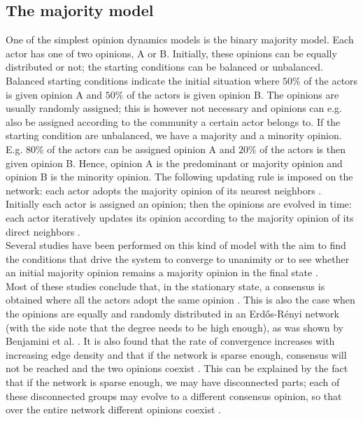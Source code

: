 \documentclass[11 pt , letterpaper , twoside , openright]{book}
\begin{document}
\subsection{The majority model}\label{majModel}

One of the simplest opinion dynamics models is the binary majority model. Each actor has one of two opinions, A or B. Initially, these opinions can be equally distributed or not; the starting conditions can be balanced or unbalanced. Balanced starting conditions indicate the initial situation where $50 \%$ of the actors is given opinion A and $50 \%$ of the actors is given opinion B. The opinions are usually randomly assigned; this is however not necessary and opinions can e.g. also be assigned according to the community a certain actor belongs to. If the starting condition are unbalanced, we have a majority and a minority opinion. E.g. $80 \%$ of the actors can be assigned opinion A and $20 \%$ of the actors is then given opinion B. Hence, opinion A is the predominant or majority opinion and opinion B is the minority opinion. The following updating rule is imposed on the network: each actor adopts the majority opinion of its nearest neighbors \cite{Nguyen2020}. Initially each actor is assigned an opinion; then the opinions are evolved in time: each actor iteratively updates its opinion according to the majority opinion of its direct neighbors \cite{Nguyen2020}.\\
\newline
Several studies have been performed on this kind of model with the aim to find the conditions that drive the system to converge to unanimity or to see whether an initial majority opinion remains a majority opinion in the final state \cite{Nguyen2020}.\\
\newline
Most of these studies conclude that, in the stationary state, a consensus is obtained where all the actors adopt the same opinion \cite{Nguyen2020}. This is also the case when the opinions are equally and randomly distributed in an Erd\H{o}s-R\'{e}nyi network (with the side note that the degree needs to be high enough), as was shown by Benjamini et al. \cite{Benjamini2016}. It is also found that the rate of convergence increases with increasing edge density and that if the network is sparse enough, consensus will not be reached and the two opinions coexist \cite{Nguyen2020}. This can be explained by the fact that if the network is sparse enough, we may have disconnected parts; each of these disconnected groups may evolve to a different consensus opinion, so that over the entire network different opinions coexist \cite{Nguyen2020}.
\end{document}
